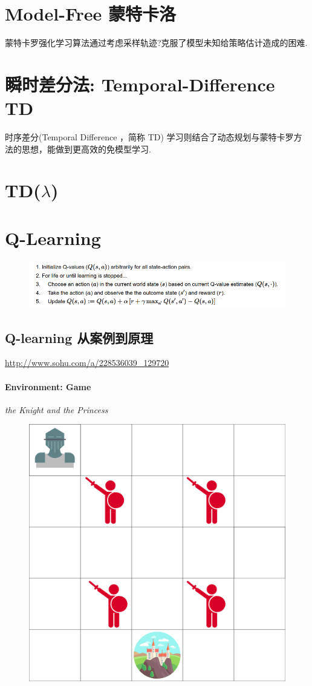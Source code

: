 \documentclass[UTF8,a4paper,12pt]{ctexbook}
\begin{document}
		
	\section{Model-Free 蒙特卡洛}
		蒙特卡罗强化学习算法通过考虑采样轨迹?克服了模型未知给策略估计造成的困难.
		
		
		
	\section{瞬时差分法: Temporal-Difference TD}
		时序差分(Temporal Difference ，简称 TD) 学习则结合了动态规划与蒙特卡罗方法的思想，能做到更高效的免模型学习.
		
	\section{TD($\lambda$)}
				
	\section{Q-Learning}
		\begin{figure}[H]
			\centering
			\includegraphics[width=\linewidth]{qFuncProcess2}
		\end{figure}
		\subsection{Q-learning 从案例到原理}	
			\url{http://www.sohu.com/a/228536039_129720}
			
			\paragraph{Environment: Game}
				\textit{the Knight and the Princess}
				
				\begin{figure}[H]
					\centering
					\includegraphics[width=.5\linewidth]{game01}
				\end{figure}
				
\end{document}
